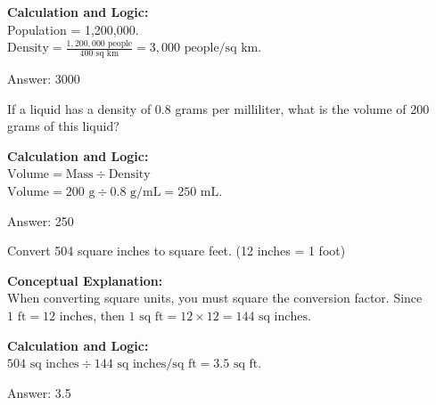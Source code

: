 \documentclass[11pt,paper=a4,answers]{exam}
\begin{document}
\begin{questions}
\begin{solution}
\textbf{Calculation and Logic:} \\
Population = 1,200,000. \\
$\text{Density} = \frac{1,200,000 \text{ people}}{400 \text{ sq km}} = 3,000 \text{ people/sq km}$.

\vspace{30pt}

Answer: \colorbox{yellow!100}{3000}
\end{solution}

\vspace{60pt}

\question
If a liquid has a density of 0.8 grams per milliliter, what is the volume of 200 grams of this liquid?

\begin{solution}
\textbf{Calculation and Logic:} \\
$\text{Volume} = \text{Mass} \div \text{Density}$ \\
$\text{Volume} = 200 \text{ g} \div 0.8 \text{ g/mL} = 250 \text{ mL}$.

\vspace{30pt}

Answer: \colorbox{yellow!100}{250}
\end{solution}

\vspace{60pt}

\question
Convert 504 square inches to square feet. (12 inches = 1 foot)

\begin{solution}
\textbf{Conceptual Explanation:} \\
When converting square units, you must square the conversion factor. Since $1 \text{ ft} = 12 \text{ inches}$, then $1 \text{ sq ft} = 12 \times 12 = 144 \text{ sq inches}$.

\vspace{30pt}

\textbf{Calculation and Logic:} \\
$504 \text{ sq inches} \div 144 \text{ sq inches/sq ft} = 3.5 \text{ sq ft}$.

\vspace{30pt}

Answer: \colorbox{yellow!100}{3.5}
\end{solution}


\end{questions}
\end{document}
